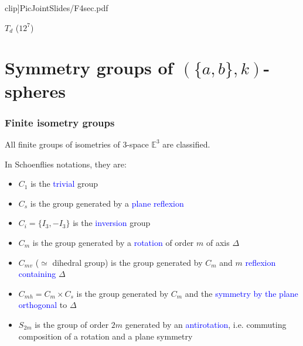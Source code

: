 \documentclass{beamer}
\begin{document}
\begin{frame}
\begin{center}
\begin{minipage}[b]{24mm}
{clip]{PicJointSlides/F4sec.pdf}}\par
 $T_{d}$ ($12^7$)
\end{minipage}
\end{center}  



\end{frame}

\section[]{Symmetry groups of $(\{a,b\},k)$-spheres}




\begin{frame}\frametitle{Finite isometry groups}
\vspace{-1mm}


All finite groups of isometries of $3$-space $\mathbb{E}^3$ are 
classified. 

In Schoenflies notations, they are:
\begin{itemize}
\item $C_1$ is the \textcolor{blue}{trivial} group
\item $C_s$ is the group generated by a \textcolor{blue}{plane reflexion}
\item $C_i=\{I_3, -I_3\}$ is the \textcolor{blue}{inversion} group
\item $C_m$ is the group generated by a \textcolor{blue}{rotation} of 
order 
$m$ of axis $\Delta$
\item $C_{mv}$ ($\simeq$ dihedral group) is the group generated by $C_m$ 
and $m$ \textcolor{blue}{reflexion containing} $\Delta$
\item $C_{mh}=C_m\times C_s$ is the group generated by $C_m$ and the 
\textcolor{blue}{symmetry by the plane orthogonal} to $\Delta$
\item $S_{2m}$ is the group of order $2m$ generated by an 
\textcolor{blue}{antirotation}, i.e. commuting composition of a rotation
and a plane symmetry
\end{itemize}
\end{frame}
\end{document}
